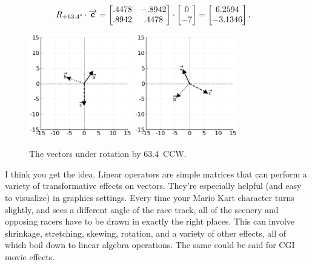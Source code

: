 \vspace{-.2in}
\begin{align*}
R_{+63.4\degree} \cdot \overrightarrow{\textbf{c}} &=
\begin{bmatrix}
.4478 & -.8942 \\
.8942 & .4478 \\
\end{bmatrix} \cdot
\begin{bmatrix}
0 \\ -7 \\
\end{bmatrix} =
\begin{bmatrix}
6.2594 \\ -3.1346 \\
\end{bmatrix}.
\end{align*}

\begin{figure}[hb]
\centering
\includegraphics[width=0.40\textwidth]{preoperators.png}
\includegraphics[width=0.40\textwidth]{rotate634op.png}
\caption[.]{The vectors under rotation by 63.4\textdegree\ CCW.}
\label{fig:rotate634op}
\end{figure}

\bigskip


I think you get the idea. Linear operators are simple matrices that can perform
a variety of transformative effects on vectors. They're especially helpful (and
easy to visualize) in graphics settings. Every time your Mario Kart character
turns slightly, and sees a different angle of the race track, all of the
scenery and opposing racers have to be drawn in exactly the right places. This
can involve shrinkage, stretching, skewing, rotation, and a variety of other
effects, all of which boil down to linear algebra operations. The same could be
said for CGI movie effects.

